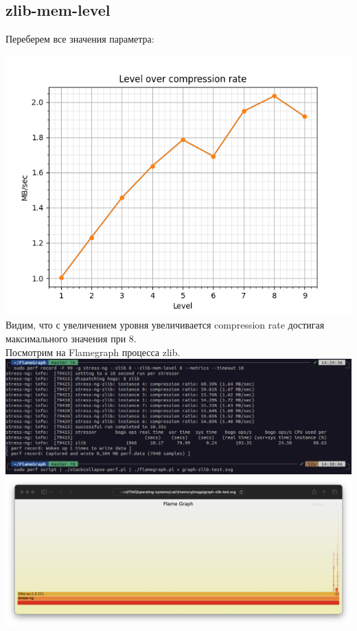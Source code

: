\subsection{zlib-mem-level}
Переберем все значения параметра:

\includegraphics[width=\textwidth]{./memory/image/zsh-mem-level-compr.png}
Видим, что с увеличением уровня увеличивается compression rate достигая максимального значения при 8.\\
Посмотрим на Flamegraph процесса zlib.\\
\includegraphics[width=\textwidth]{./memory/image/Flamegraph-script.png}
\includegraphics[width=\textwidth]{./memory/image/graph-zlib-test.png}
